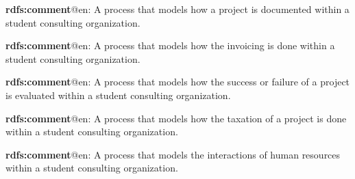 \documentclass[a4paper, DIV=13, BCOR=0cm]{scrbook}
\begin{document}
\begin{mdframed}[style=onto-3, frametitle={Project Documentation Process}]
	{%
		\begin{compactitem}
			\item \textbf{rdfs:comment}@en: A process that models how a project is documented within a student consulting organization.
		\end{compactitem}
	} %
\end{mdframed}

\begin{mdframed}[style=onto-3, frametitle={Project Invoicing Process}]
	{%
		\begin{compactitem}
			\item \textbf{rdfs:comment}@en: A process that models how the invoicing is done within a student consulting organization.
		\end{compactitem}
	} %
\end{mdframed}

\begin{mdframed}[style=onto-3, frametitle={Project Evaluation Process}]
	{%
		\begin{compactitem}
			\item \textbf{rdfs:comment}@en: A process that models how the success or failure of a project is evaluated within a student consulting organization.
		\end{compactitem}
	} %
\end{mdframed}

\begin{mdframed}[style=onto-3, frametitle={Project Taxation Process}]
	{%
		\begin{compactitem}
			\item \textbf{rdfs:comment}@en: A process that models how the taxation of a project is done within a student consulting organization.
		\end{compactitem}
	} %
\end{mdframed}

\begin{mdframed}[style=onto-1, frametitle={Human Resource Process}]
	{%
		\begin{compactitem}
			\item \textbf{rdfs:comment}@en: A process that models the interactions of human resources within a student consulting organization.
		\end{compactitem}
	} %
\end{mdframed}
\end{document}
